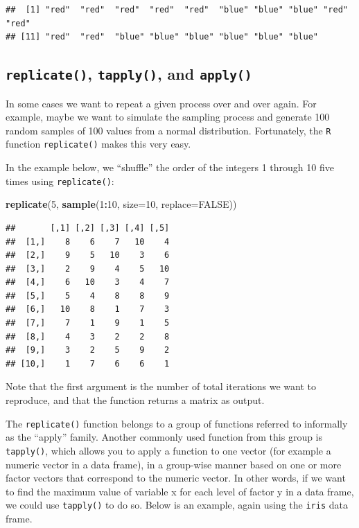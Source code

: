 \documentclass[]{book}
\newenvironment{Shaded}{\begin{snugshade}}{\end{snugshade}}
\newcommand{\DataTypeTok}[1]{\textcolor[rgb]{0.13,0.29,0.53}{#1}}
\newcommand{\DecValTok}[1]{\textcolor[rgb]{0.00,0.00,0.81}{#1}}
\newcommand{\KeywordTok}[1]{\textcolor[rgb]{0.13,0.29,0.53}{\textbf{#1}}}
\newcommand{\NormalTok}[1]{#1}
\newcommand{\OperatorTok}[1]{\textcolor[rgb]{0.81,0.36,0.00}{\textbf{#1}}}
\newcommand{\OtherTok}[1]{\textcolor[rgb]{0.56,0.35,0.01}{#1}}
\begin{document}
\begin{verbatim}
##  [1] "red"  "red"  "red"  "red"  "red"  "blue" "blue" "blue" "red"  "red" 
## [11] "red"  "red"  "blue" "blue" "blue" "blue" "blue" "blue"
\end{verbatim}

\hypertarget{replicate-tapply-and-apply}{%
\subsection{\texorpdfstring{\texttt{replicate()}, \texttt{tapply()}, and \texttt{apply()}}{replicate(), tapply(), and apply()}}\label{replicate-tapply-and-apply}}

In some cases we want to repeat a given process over and over again. For example, maybe we want to simulate the sampling process and generate 100 random samples of 100 values from a normal distribution. Fortunately, the \texttt{R} function \texttt{replicate()} makes this very easy.

In the example below, we ``shuffle'' the order of the integers 1 through 10 five times using \texttt{replicate()}:

\begin{Shaded}
\begin{Highlighting}[]
\KeywordTok{replicate}\NormalTok{(}\DecValTok{5}\NormalTok{, }\KeywordTok{sample}\NormalTok{(}\DecValTok{1}\OperatorTok{:}\DecValTok{10}\NormalTok{, }\DataTypeTok{size=}\DecValTok{10}\NormalTok{, }\DataTypeTok{replace=}\OtherTok{FALSE}\NormalTok{))}
\end{Highlighting}
\end{Shaded}

\begin{verbatim}
##       [,1] [,2] [,3] [,4] [,5]
##  [1,]    8    6    7   10    4
##  [2,]    9    5   10    3    6
##  [3,]    2    9    4    5   10
##  [4,]    6   10    3    4    7
##  [5,]    5    4    8    8    9
##  [6,]   10    8    1    7    3
##  [7,]    7    1    9    1    5
##  [8,]    4    3    2    2    8
##  [9,]    3    2    5    9    2
## [10,]    1    7    6    6    1
\end{verbatim}

Note that the first argument is the number of total iterations we want to reproduce, and that the function returns a matrix as output.

The \texttt{replicate()} function belongs to a group of functions referred to informally as the ``apply'' family. Another commonly used function from this group is \texttt{tapply()}, which allows you to apply a function to one vector (for example a numeric vector in a data frame), in a group-wise manner based on one or more factor vectors that correspond to the numeric vector. In other words, if we want to find the maximum value of variable x for each level of factor y in a data frame, we could use \texttt{tapply()} to do so. Below is an example, again using the \texttt{iris} data frame.
\end{document}
